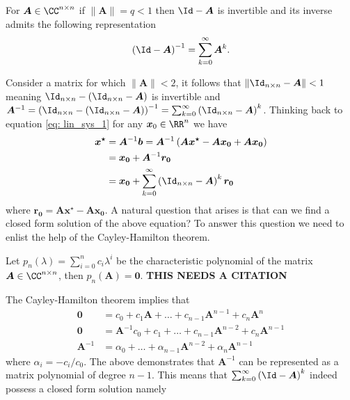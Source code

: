 \begin{thm} \label{theorem: invert_mat_norm}
    For $\bm{A} \in \CC^{n \times n}$ if $\| \bm{A} \| = q < 1$ then $\Id - \bm{A}$ is invertible and its inverse admits the following representation
    \[
        \left( \Id - \bm{A} \right)^{-1} = \sum_{k=0}^{\infty} \bm{A}^k.
    \]
    \cite{BerezanskyMakarovich1996FaV1}
\end{thm}
Consider a matrix for which $\| \bm{A} \| < 2$, it follows that $\| \Id_{n \times n} - \bm{A} \| < 1$ meaning $\Id_{n \times n} - \left( \Id_{n \times n} - \bm{A} \right)$ is invertible and $\bm{A}^{-1} = \left( \Id_{n \times n} - \left( \Id_{n \times n} - \bm{A} \right) \right)^{-1} = \sum_{k=0}^{\infty} \left( \Id_{n \times n} - \bm{A} \right)^{k}$. Thinking back to equation \ref{eq: lin_sys_1} for any $\bm{x}_0 \in \RR^{n}$ we have
\begin{align*}
    \bm{x^{\star}} & = \bm{A}^{-1} \bm{b} = \bm{A}^{-1} \left( \bm{A} \bm{x^{\star}} - \bm{A} \bm{x_0} + \bm{A} \bm{x_0} \right) \\
                   & = \bm{x_0} + \bm{A}^{-1} \bm{r_0}                                                                           \\
                   & = \bm{x_0} + \sum_{k=0}^{\infty} \left( \Id_{n \times n} - \bm{A} \right)^k \bm{r_0}
\end{align*}
where $\bm{r_0} = \bm{A} \bm{x^{\star}} - \bm{A} \bm{x_0}$. A natural question that arises is that can we find a closed form solution of the above equation? To answer this question we need to enlist the help of the Cayley-Hamilton theorem.
\begin{thm} \label{theorem: cayley_amilton}
    Let $p_n \left( \lambda \right) = \sum_{i=0}^{n} c_i \lambda^{i}$ be the characteristic polynomial of the matrix $\bm{A} \in \CC^{n \times n}$, then $p_n \left( \bm{A} \right) = \bm{0}$. {\color{red} \textbf{THIS NEEDS A CITATION}}
\end{thm}
The Cayley-Hamilton theorem implies that
\begin{align*}
    \bm{0}      & = c_0 + c_1 \bm{A} + \ldots + c_{n-1} \bm{A}^{n-1} + c_{n} \bm{A}^{n}        \\
    \bm{0}      & = \bm{A}^{-1} c_0 + c_1 + \ldots + c_{n-1} \bm{A}^{n-2} + c_{n} \bm{A}^{n-1} \\
    \bm{A}^{-1} & = \alpha_0 + \ldots + \alpha_{n-1} \bm{A}^{n-2} + \alpha_{n} \bm{A}^{n-1}
\end{align*}
where $\alpha_i = -c_i / c_0$. The above demonstrates that $\bm{A}^{-1}$ can be represented as a matrix polynomial of degree $n-1$. This means that $\sum_{k=0}^{\infty} \left( \Id - \bm{A} \right)^k$ indeed possess a closed form solution namely
